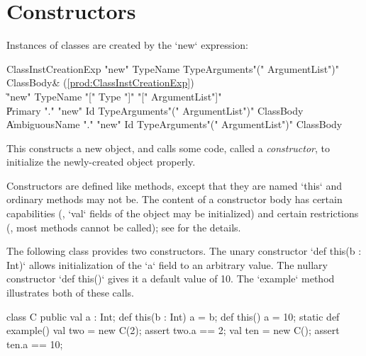 \section{Constructors}

Instances of classes are created by the \xcd`new` expression: \\
\begin{bbgrammar}
ClassInstCreationExp \: \xcd"new" TypeName TypeArguments\opt \xcd"(" ArgumentList\opt \xcd")" ClassBody\opt & (\ref{prod:ClassInstCreationExp}) \\
                    \| \xcd"new" TypeName \xcd"[" Type \xcd"]" \xcd"[" ArgumentList\opt \xcd"]" \\
                    \| Primary \xcd"." \xcd"new" Id TypeArguments\opt \xcd"(" ArgumentList\opt \xcd")" ClassBody\opt \\
                    \| AmbiguousName \xcd"." \xcd"new" Id TypeArguments\opt \xcd"(" ArgumentList\opt \xcd")" ClassBody\opt \\
\end{bbgrammar}

This constructs a new object, and calls some code, called a {\em constructor},
to initialize the newly-created object properly.

Constructors are defined like methods, except that they are named \xcd`this`
and ordinary methods may not be.    The content of a constructor body has
certain capabilities (\eg, \xcd`val` fields of the object may be initialized)
and certain restrictions (\eg, most methods cannot be called); see
 for the details.

\begin{ex}

The following class provides two constructors.  The unary constructor 
\xcd`def this(b : Int)` allows initialization of the \xcd`a` field to an 
arbitrary value.  The nullary constructor \xcd`def this()` gives it a default
value of 10.  The \xcd`example` method illustrates both of these calls.


\begin{xten}
class C {
  public val a : Int;
  def this(b : Int) { a = b; } 
  def this()        { a = 10; }
  static def example() {
     val two = new C(2);
     assert two.a == 2;
     val ten = new C(); 
     assert ten.a == 10;
  }
}
\end{xten}
%
\end{ex}

